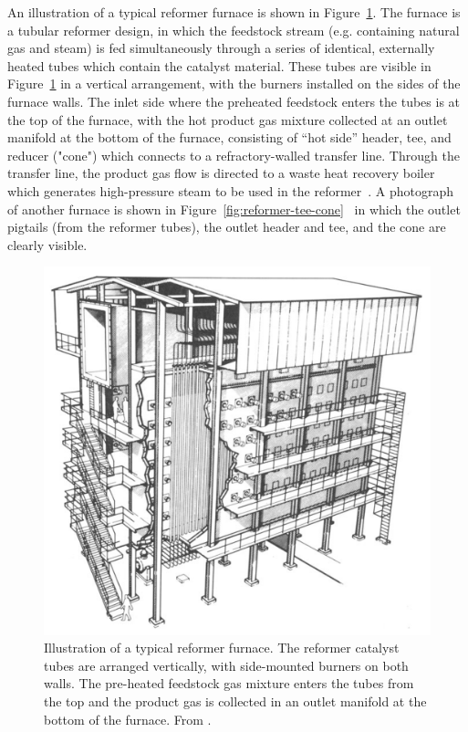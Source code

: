 An illustration of a typical reformer furnace is shown in Figure~\ref{fig:reformer-furnace}. The furnace is a tubular reformer design, in which the feedstock stream (e.g. containing natural gas and steam) is fed simultaneously through a series of identical, externally heated tubes which contain the catalyst material. These tubes are visible in Figure~\ref{fig:reformer-furnace} in a vertical arrangement, with the burners installed on the sides of the furnace walls. The inlet side where the preheated feedstock enters the tubes is at the top of the furnace, with the hot product gas mixture collected at an outlet manifold at the bottom of the furnace, consisting of ``hot side'' header, tee, and reducer ("cone") which connects to a refractory-walled transfer line. Through the transfer line, the product gas flow is directed to a waste heat recovery boiler which generates high-pressure steam to be used in the reformer~\cite{rostrup-nielsen_catalytic_1984}. A photograph of another furnace is shown in Figure~\ref{fig:reformer-tee-cone}~\cite{penso_repair_2006} in which the outlet pigtails (from the reformer tubes), the outlet header and tee, and the cone are clearly visible.

\begin{figure}[h]
\centering
\includegraphics{figures/reformer-furnace}
\caption[Illustration of a typical reformer furnace.]{Illustration of a typical reformer furnace. The reformer catalyst tubes are arranged vertically, with side-mounted burners on both walls. The pre-heated feedstock gas mixture enters the tubes from the top and the product gas is collected in an outlet manifold at the bottom of the furnace.  From \citet[Fig.~9]{rostrup-nielsen_catalytic_1984}.}
\label{fig:reformer-furnace}
\end{figure}

